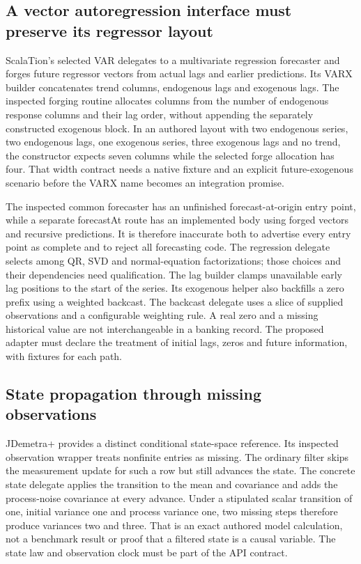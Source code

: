 \subsection{A vector autoregression interface must preserve its regressor layout}

ScalaTion's selected VAR delegates to a multivariate regression forecaster and forges future regressor vectors from actual lags and earlier predictions. Its VARX builder concatenates trend columns, endogenous lags and exogenous lags. The inspected forging routine allocates columns from the number of endogenous response columns and their lag order, without appending the separately constructed exogenous block. In an authored layout with two endogenous series, two endogenous lags, one exogenous series, three exogenous lags and no trend, the constructor expects seven columns while the selected forge allocation has four. That width contract needs a native fixture and an explicit future-exogenous scenario before the VARX name becomes an integration promise.\citep{exec25_jdyn_scalation,exec25_jdyn_choice}

The inspected common forecaster has an unfinished forecast-at-origin entry point, while a separate forecastAt route has an implemented body using forged vectors and recursive predictions. It is therefore inaccurate both to advertise every entry point as complete and to reject all forecasting code. The regression delegate selects among QR, SVD and normal-equation factorizations; those choices and their dependencies need qualification. The lag builder clamps unavailable early lag positions to the start of the series. Its exogenous helper also backfills a zero prefix using a weighted backcast. The backcast delegate uses a slice of supplied observations and a configurable weighting rule. A real zero and a missing historical value are not interchangeable in a banking record. The proposed adapter must declare the treatment of initial lags, zeros and future information, with fixtures for each path.\citep{exec25_jdyn_scalation}

\subsection{State propagation through missing observations}

JDemetra+ provides a distinct conditional state-space reference. Its inspected observation wrapper treats nonfinite entries as missing. The ordinary filter skips the measurement update for such a row but still advances the state. The concrete state delegate applies the transition to the mean and covariance and adds the process-noise covariance at every advance. Under a stipulated scalar transition of one, initial variance one and process variance one, two missing steps therefore produce variances two and three. That is an exact authored model calculation, not a benchmark result or proof that a filtered state is a causal variable. The state law and observation clock must be part of the API contract.\citep{exec25_jdyn_jdplus,exec25_jdyn_choice}

